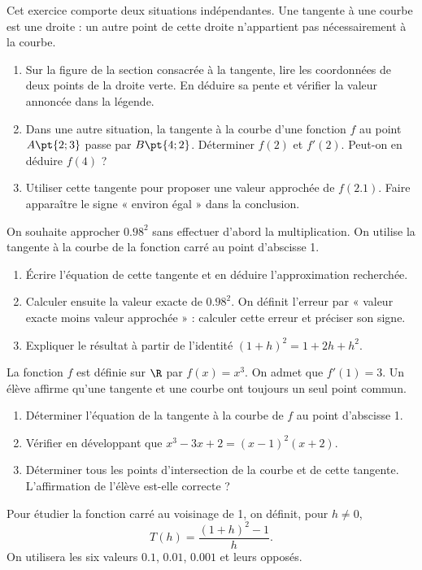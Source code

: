 Cet exercice comporte deux situations indépendantes. Une tangente à une courbe est une droite : un autre point de cette droite n’appartient pas nécessairement à la courbe.
\begin{enumerate}[label=\arabic*.]
\item Sur la figure de la section consacrée à la tangente, lire les coordonnées de deux points de la droite verte. En déduire sa pente et vérifier la valeur annoncée dans la légende.
\item Dans une autre situation, la tangente à la courbe d’une fonction $f$ au point $A\pt{2;3}$ passe par $B\pt{4;2}$. Déterminer $f(2)$ et $f\prime(2)$. Peut-on en déduire $f(4)$ ?
\item Utiliser cette tangente pour proposer une valeur approchée de $f(\num{2,1})$. Faire apparaître le signe « environ égal » dans la conclusion.
\end{enumerate}
On souhaite approcher $\num{0,98}^2$ sans effectuer d’abord la multiplication. On utilise la tangente à la courbe de la fonction carré au point d’abscisse 1.
\begin{enumerate}[label=\arabic*.]
\item Écrire l’équation de cette tangente et en déduire l’approximation recherchée.
\item Calculer ensuite la valeur exacte de $\num{0,98}^2$. On définit l’erreur par « valeur exacte moins valeur approchée » : calculer cette erreur et préciser son signe.
\item Expliquer le résultat à partir de l’identité $(1+h)^2=1+2h+h^2$.
\end{enumerate}
La fonction $f$ est définie sur $\R$ par $f(x)=x^3$. On admet que $f\prime(1)=3$. Un élève affirme qu’une tangente et une courbe ont toujours un seul point commun.
\begin{enumerate}[label=\arabic*.]
\item Déterminer l’équation de la tangente à la courbe de $f$ au point d’abscisse 1.
\item Vérifier en développant que $x^3-3x+2=(x-1)^2(x+2)$.
\item Déterminer tous les points d’intersection de la courbe et de cette tangente. L’affirmation de l’élève est-elle correcte ?
\end{enumerate}
Pour étudier la fonction carré au voisinage de 1, on définit, pour $h\ne0$,\[T(h)=\dfrac{(1+h)^2-1}{h}.\]On utilisera les six valeurs $\num{0,1}$, $\num{0,01}$, $\num{0,001}$ et leurs opposés.
